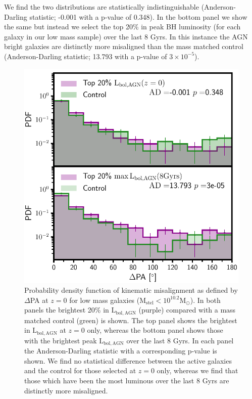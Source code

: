 We find the two distributions are statistically indistinguishable (Anderson-Darling statistic; -0.001 with a p-value of 0.348). In the bottom panel we show the same but instead we select the top 20\% in peak BH luminosity (for each galaxy in our low mass sample) over the last 8 Gyrs. In this instance the AGN bright galaxies are distinctly more misaligned than the mass matched control (Anderson-Darling statistic; 13.793 with a p-value of $3 \times 10^{-5}$). 

\begin{figure}
    \centering
	\includegraphics[width=0.9\linewidth]{misalignment_BH/PA_distribution_low_mass_z0_max_comparison.pdf}
    \caption{Probability density function of kinematic misalignment as defined by $\Delta$PA at $z=0$ for low mass galaxies ($\mathrm{M_{stel} < 10^{10.2}M_{\odot}}$). In both panels the brightest 20\% in $\mathrm{L_{bol,AGN}}$ (purple) compared with a mass matched control (green) is shown. The top panel shows the brightest in $\mathrm{L_{bol,AGN}}$ at $z=0$ only, whereas the bottom panel shows those with the brightest peak $\mathrm{L_{bol, AGN}}$ over the last 8 Gyrs. In each panel the Anderson-Darling statistic with a corresponding p-value is shown. We find no statistical difference between the active galaxies and the control for those selected at $z=0$ only, whereas we find that those which have been the most luminous over the last 8 Gyrs are distinctly more misaligned.}
    \label{fig:PAdist}
\end{figure}

